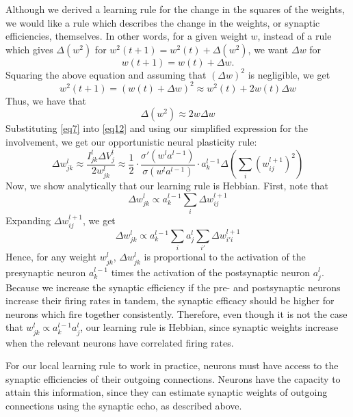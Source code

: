 \documentclass[12pt]{article}
\begin{document}
Although we derived a learning rule for the change in the squares of the weights, we would like a rule which describes the change in the weights, or synaptic efficiencies, themselves. In other words, for a given weight $w$, instead of a rule which gives $\Delta(w^2)$ for $w^2(t+1) = w^2(t) + \Delta(w^2)$, we want $\Delta w$ for
\begin{equation}
	w(t+1) = w(t) + \Delta w.
\end{equation}
Squaring the above equation and assuming that $(\Delta w)^2$ is negligible, we get
\begin{equation}
	w^2(t+1) = (w(t) + \Delta w)^2 \approx w^2(t) + 2w(t)\Delta w
\end{equation}
Thus, we have that
\begin{equation}
	\Delta (w^2) \approx 2w\Delta w\label{eq12}
\end{equation}
Substituting \ref{eq7} into \ref{eq12} and using our simplified expression for the involvement, we get our opportunistic neural plasticity rule:
\begin{equation}
	\Delta w_{jk}^l\approx \frac{I_{jk}^l \Delta V_j^l}{2w_{jk}^l}\approx\frac{1}{2}\cdot\frac{\sigma'\left(w^l a^{l-1}\right)}{\sigma\left(w^l a^{l-1}\right)}\cdot a_k^{l-1}\Delta \left(\sum_i \left(w_{ij}^{l+1}\right)^2\right)\label{eq13}
\end{equation}
Now, we show analytically that our learning rule is Hebbian. First, note that
\begin{equation}
	\Delta w_{jk}^l\propto a_k^{l-1}\sum_i \Delta w_{ij}^{l+1}
\end{equation}
Expanding $\Delta w_{ij}^{l+1}$, we get
\begin{equation}
	\Delta w_{jk}^l\propto a_k^{l-1}\sum_i a_j^l \sum_{i'} \Delta w_{i'i}^{l+1}
\end{equation}
Hence, for any weight $w_{jk}^l$, $\Delta w_{jk}^l$ is proportional to the activation of the presynaptic neuron $a_k^{l-1}$ times the activation of the postsynaptic neuron $a_j^l$. Because we increase the synaptic efficiency if the pre- and postsynaptic neurons increase their firing rates in tandem, the synaptic efficacy should be higher for neurons which fire together consistently. Therefore, even though it is not the case that $w_{jk}^l\propto a_k^{l-1}a_j^l$, our learning rule is Hebbian, since synaptic weights increase when the relevant neurons have correlated firing rates.

For our local learning rule to work in practice, neurons must have access to the synaptic efficiencies of their outgoing connections. Neurons have the capacity to attain this information, since they can estimate synaptic weights of outgoing connections using the synaptic echo, as described above.
\end{document}
